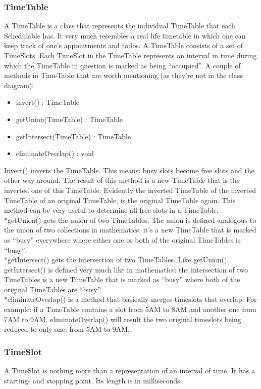 \documentclass[11pt]{article}
\begin{document}
\subsubsection{TimeTable}
A TimeTable is a class that represents the individual TimeTable that each Schedulable has. It very much resembles a real life timetable in which one can keep track of one’s appointments and todos. A TimeTable consists of a set of TimeSlots. Each TimeSlot in the TimeTable represents an interval in time during which the TimeTable in question is marked as being “occupied”. A couple of methods in TimeTable that are worth mentioning (as they're not in the class diagram):
\begin{itemize}
\item{invert() : TimeTable}
\item{getUnion(TimeTable) : TimeTable}
\item{getIntersect(TimeTable) : TimeTable}
\item{eliminateOverlap() : void}
\end{itemize}
Invert() inverts the TimeTable. This means: busy slots become free slots and the other way around. The result of this method is a new TimeTable that is the inverted one of this TimeTable. Evidently the inverted TimeTable of the inverted TimeTable of an original TimeTable, is the original TimeTable again. This method can be very useful to determine all free slots in a  TimeTable. 
\\*getUnion() gets the union of two TimeTables. The union is defined analogous to the union of two collections in mathematics: it’s a new TimeTable that is marked as “busy” everywhere where either one or both of the original TimeTables is “busy”.
\\*getIntersect() gets the intersection of two TimeTables. Like getUnion(), getIntersect() is defined very much like in mathematics: the intersection of two TimeTables is a new TimeTable that is marked as “busy” where both of the original TimeTables are “busy”.
\\*eliminateOverlap() is a method that basically merges timeslots that overlap. For example: if a TimeTable contains a slot from 5AM to 8AM and another one from 7AM to 9AM, eliminateOverlap() will result the two original timeslots being reduced to only one: from 5AM to 9AM.

\subsubsection{TimeSlot}
A TimeSlot is nothing more than a representation of an interval of time. It has a starting- and stopping point. Its length is in milliseconds.
\end{document}
